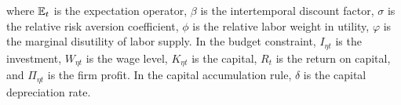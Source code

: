 \documentclass[../thesis.tex]{subfiles}
\begin{document}
	where ${\mathbb{E}_{t}}$ is the expectation operator, $\beta$ is the intertemporal discount factor, $\sigma$ is the relative risk aversion coefficient, $\phi$ is the relative labor weight in utility, $\varphi$ is the marginal disutility of labor supply. In the budget constraint,
	$I_{\eta t}$ is the investment,
	$W_{\eta t}$ is the wage level,
	$K_{\eta t}$ is the capital, $R_{t}$ is the return on capital,
	and $\Pi_{\eta t}$ is the firm profit. In the capital accumulation rule, $\delta$ is the capital depreciation rate.
\end{document}
